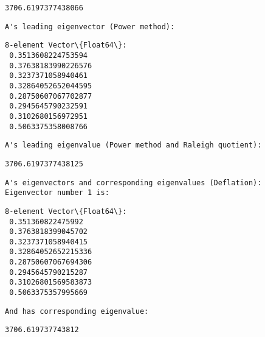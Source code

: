 \documentclass[11pt]{article}
\begin{document}
    
    \begin{Verbatim}[commandchars=\\\{\}]
3706.6197377438066
    \end{Verbatim}

    
    \begin{Verbatim}[commandchars=\\\{\}]
A's leading eigenvector (Power method):
    \end{Verbatim}

    
    \begin{Verbatim}[commandchars=\\\{\}]
8-element Vector\{Float64\}:
 0.3513608224753594
 0.37638183990226576
 0.3237371058940461
 0.32864052652044595
 0.28750607067702877
 0.2945645790232591
 0.3102680156972951
 0.5063375358008766
    \end{Verbatim}

    
    \begin{Verbatim}[commandchars=\\\{\}]
A's leading eigenvalue (Power method and Raleigh quotient):
    \end{Verbatim}

    
    \begin{Verbatim}[commandchars=\\\{\}]
3706.6197377438125
    \end{Verbatim}

    
    \begin{Verbatim}[commandchars=\\\{\}]
A's eigenvectors and corresponding eigenvalues (Deflation):
Eigenvector number 1 is:
    \end{Verbatim}

    
    \begin{Verbatim}[commandchars=\\\{\}]
8-element Vector\{Float64\}:
 0.351360822475992
 0.3763818399045702
 0.3237371058940415
 0.32864052652215336
 0.28750607067694306
 0.2945645790215287
 0.31026801569583873
 0.5063375357995669
    \end{Verbatim}

    
    \begin{Verbatim}[commandchars=\\\{\}]
And has corresponding eigenvalue:
    \end{Verbatim}

    
    \begin{Verbatim}[commandchars=\\\{\}]
3706.619737743812
    \end{Verbatim}
\end{document}
